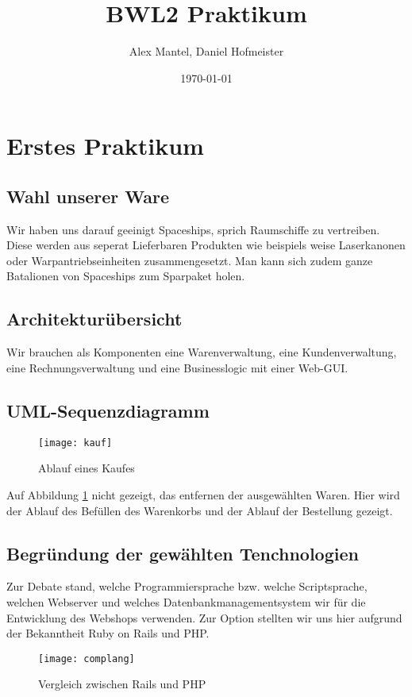 \documentclass[pdftex,10pt,a4paper]{article}
\begin{document}
\title{BWL2 Praktikum}
\author{Alex Mantel, Daniel Hofmeister}
\date{\today}
\maketitle
\newpage

\tableofcontents
\newpage

\section{Erstes Praktikum}

\subsection{Wahl unserer Ware}
Wir haben uns darauf geeinigt Spaceships, sprich Raumschiffe zu vertreiben. Diese werden aus seperat Lieferbaren Produkten wie beispiels weise Laserkanonen oder Warpantriebseinheiten zusammengesetzt. Man kann sich zudem ganze Batalionen von Spaceships zum Sparpaket holen.

\subsection{Architektur\"ubersicht}
Wir brauchen als Komponenten eine Warenverwaltung, eine Kundenverwaltung, eine Rechnungsverwaltung und eine Businesslogic mit einer Web-GUI.

\subsection{UML-Sequenzdiagramm}
\begin{figure}[h]
	\caption{Ablauf eines Kaufes}
	\label{fig:kauf}
	\texttt{[image: kauf]}
\end{figure}				
Auf Abbildung \ref{fig:kauf} nicht gezeigt, das entfernen der ausgew\"ahlten Waren. Hier wird der Ablauf des Bef\"ullen des Warenkorbs und der Ablauf der Bestellung gezeigt.

\subsection{Begr\"undung der gew\"ahlten Tenchnologien}
Zur Debate stand, welche Programmiersprache bzw. welche Scriptsprache, welchen Webserver und welches Datenbankmanagementsystem wir f\"ur die Entwicklung des Webshops verwenden. Zur Option stellten wir uns hier aufgrund der Bekanntheit Ruby on Rails und PHP.

\begin{figure}[h]
	\caption{Vergleich zwischen Rails und PHP}
	\cite{tbray}
	\label{fig:vergleich}
	\texttt{[image: complang]}
\end{figure}
\end{document}
